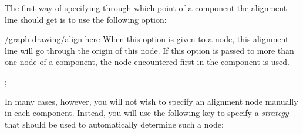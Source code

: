 The first way of specifying through which point of a component the
alignment line should get is to use the following option:

\begin{key}{/graph drawing/align here}
  When this option is given to a node, this alignment line will go
  through the origin of this node. If this option is passed to more
  than one node of a component, the node encountered first in the
  component is used.
\begin{codeexample}[]
\tikz {};
\end{codeexample}
\end{key}

In many cases, however, you will not wish to specify an alignment node
manually in each component. Instead, you will use the following key to
specify a \emph{strategy} that should be used to automatically
determine such a node:

